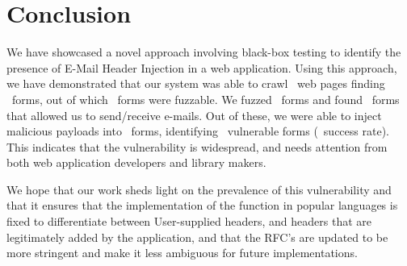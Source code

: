 \chapter{Conclusion}
We have showcased a novel approach involving black-box testing to identify the presence of E-Mail Header Injection in a web application. Using this approach, we have demonstrated that our system was able to crawl \urls\ web pages finding \forms\ forms, out of which \emailforms\ forms were fuzzable. We fuzzed \fuzzed\ forms and found \recd\  forms that allowed us to send/receive e-mails. Out of these, we were able to inject malicious payloads into \malfuzzed\ forms, identifying \success\ vulnerable forms (\successDelta\ success rate). This indicates that the vulnerability is widespread, and needs attention from both web application developers and library makers. 

We hope that our work sheds light on the prevalence of this vulnerability and that it ensures that the implementation of the  function in popular languages is fixed to differentiate between User-supplied headers, and headers that are legitimately added by the application, and that the RFC's are updated to be more stringent and make it less ambiguous for future implementations. 